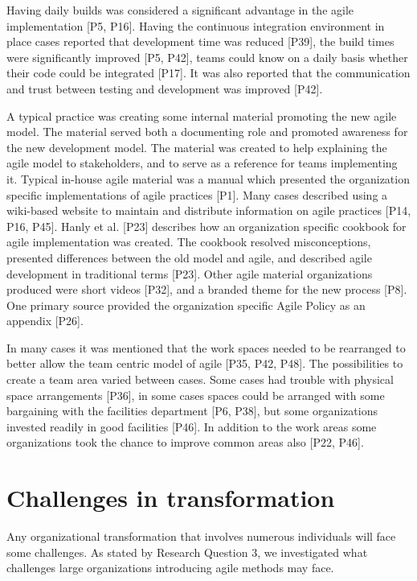 Having daily builds was considered a significant advantage in the agile
implementation [P5, P16]. Having the continuous integration environment in place
cases reported that development time was reduced [P39], the build times were
significantly improved [P5, P42], teams could know on a daily basis whether
their code could be integrated [P17]. It was also reported that the
communication and trust between testing and development was improved [P42].


A typical practice was creating some internal material promoting the new agile
model. The material served both a documenting role and promoted awareness for
the new development model. The material was created to help explaining the agile
model to stakeholders, and to serve as a reference for teams implementing it.
Typical in-house agile material was a manual which presented the organization
specific implementations of agile practices [P1]. Many cases described using a
wiki-based website to maintain and distribute information on agile practices
[P14, P16, P45]. Hanly et al. [P23] describes how an organization specific
cookbook for agile implementation was created. The cookbook resolved
misconceptions, presented differences between the old model and agile, and
described agile development in traditional terms [P23]. Other agile material
organizations produced were short videos [P32], and a branded theme for the new
process [P8]. One primary source provided the organization specific Agile Policy
as an appendix [P26].


In many cases it was mentioned that the work spaces needed to be rearranged to
better allow the team centric model of agile [P35, P42, P48]. The possibilities
to create a team area varied between cases. Some cases had trouble with physical
space arrangements [P36], in some cases spaces could be arranged with some
bargaining with the facilities department [P6, P38], but some organizations
invested readily in good facilities [P46]. In addition to the work areas some
organizations took the chance to improve common areas also [P22, P46].


\clearpage

\section{Challenges in transformation}

Any organizational transformation that involves numerous individuals will face
some challenges. As stated by Research Question 3, we investigated what
challenges large organizations introducing agile methods may face.

